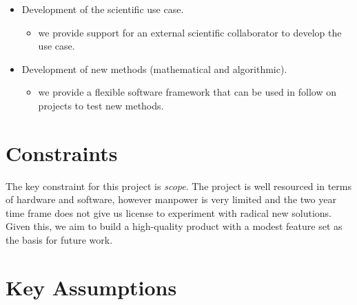 \documentclass[11pt,a4paper]{article}
\begin{document}
\begin{itemize}
    \item Development of the scientific use case.
    \begin{itemize}
        \item we provide support for an external scientific collaborator to develop the use case.
    \end{itemize}
    \item Development of new methods (mathematical and algorithmic).
    \begin{itemize}
        \item we provide a flexible software framework that can be used in follow on projects to test new methods.
    \end{itemize}
\end{itemize}

\section{Constraints}

The key constraint for this project is \emph{scope}.
The project is well resourced in terms of hardware and software, however manpower is very limited and the two year time frame does not give us license to experiment with radical new solutions.
Given this, we aim to build a high-quality product with a modest feature set as the basis for future work.

\section{Key Assumptions}
\end{document}
